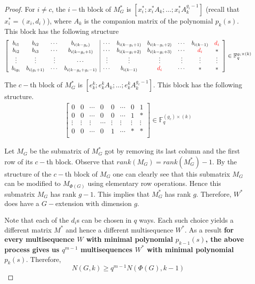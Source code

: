 \documentclass[letterpaper, 12 pt]{article}  \usepackage{amssymb}
\newcommand{\F}{\mathbb{F}}
\begin{document}
\begin{proof}
 For $i \neq c$, the $i-$th block of $M_G^*$ is
$[x_i^*;x_i^*A_{k};\ldots;x_i^*A_{k}^{g_i-1}]$ (recall that $x_i^* =
(x_i,d_i)$), where $A_{k}$ is the companion matrix of the polynomial
$p_{k}(s)$. This block has the following structure
\begin{eqnarray*}
\left[ \begin{array}{cccc|cccccc}
  b_{i1} & b_{i2} & \cdots & b_{i(k-g_c)} & \cdots & b_{i(k-g_i+1)} &
 b_{i(k-g_i +2)} &\cdots  & b_{i(k-1)} & \textcolor{red}{d_i}\\
  b_{i2} & b_{i3} & \cdots & b_{i(k-g_c+1)} & \cdots& b_{i(k-g_i+2)} &
 b_{i(k-g_i+3)} &\cdots  & \textcolor{red}{ d_i} & *\\
  \vdots & \vdots & \vdots & \cdots & \vdots & \vdots & \vdots & \vdots&
\vdots & {\vdots}\\
  b_{ig_i} & b_{i(g_i+1)} & \cdots & b_{i(k-g_c+g_i-1)} &\cdots &
b_{i(k-1)} & \textcolor{red}{d_i}  & \cdots &  * & {*}\\
 \end{array}\right]\in \F_q^{g_i\times (k)}
\end{eqnarray*}

 The $c-$th block of $M_G^*$ is
$[e_{k}^{k};e_{k}^{k}A_{k};\ldots;e_{k}^{k}A_{k}^{g_c-1}]$.
This block has the following structure.
 \begin{eqnarray*}
\left[ \begin{array}{cccc|cccc}
  0 & 0 & \cdots & 0 & 0 & \cdots & 0 & 1\\
  0 & 0 & \cdots & 0 & 0 & \cdots & 1 & *\\
  \vdots & \vdots & \vdots & \cdots & \vdots & \vdots & \vdots & \vdots\\
  0 & 0 & \cdots &  0& 1 & \cdots & * & *\\
 \end{array}\right]\in \F_q^{(g_c) \times (k)}
\end{eqnarray*}
 

Let $M_G$ be the submatrix of $M_G^*$ got by removing its last column and the
first row of its $c-$th block. Observe that $rank(M_G) = rank(M_G^*)-1$. By the
structure of the $c-$th block of
$M_G$ one can clearly see that this submatrix $M_G$ can be modified to $M_{\Phi(G)}$
using elementary row operations. Hence this submatrix $M_G$ has rank $g-1$. This
implies that $M_G^*$ has rank $g$. Therefore, $W^*$ does have a $G-$extension with dimension $g$.

Note that each of the $d_i$s can be chosen in
$q$ ways. Each such choice yields a different matrix $M^*$ and hence a
different multisequence $W^*$. As a
result {\bf for every multisequence $W$ with minimal polynomial $p_{k-1}(s)$,
the above process gives us $q^{m-1}$
multisequences $W^*$ with minimal polynomial $p_{k}(s)$}. 
Therefore, 
\begin{equation}
\label{eqn1}
 N(G,k) \geq q^{m-1}N(\Phi(G),k-1)
\end{equation}


\end{proof}
\end{document}
